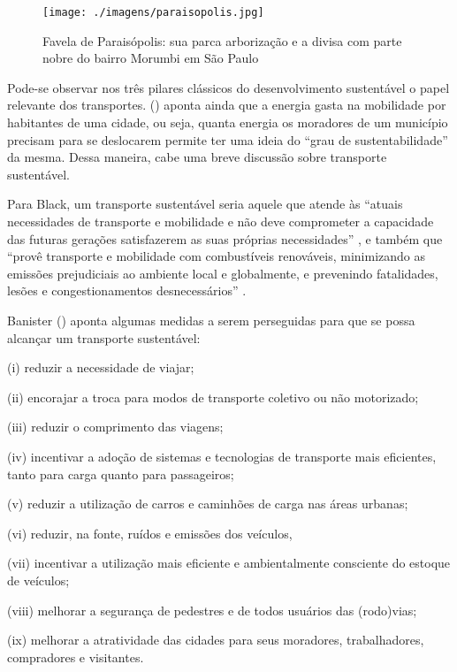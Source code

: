 \begin{figure}[htb]%
    \caption{\label{fig:paraisopolis}Favela de Paraisópolis: sua parca arborização e a divisa com parte nobre do bairro Morumbi em São Paulo}%
    \begin{center}%
        \texttt{[image: ./imagens/paraisopolis.jpg]}%
    \end{center}%
\end{figure}%

Pode-se observar nos três pilares clássicos do desenvolvimento sustentável o papel relevante dos transportes.  (\citeyear{VASCONCELLOS2012}) aponta ainda que a energia gasta na mobilidade por habitantes de uma cidade, ou seja, quanta energia os moradores de um município precisam para se deslocarem permite ter uma ideia do ``grau de sustentabilidade'' da mesma. Dessa maneira, cabe uma breve discussão sobre transporte sustentável.

Para Black, um transporte sustentável seria aquele que atende às ``atuais necessidades de transporte e mobilidade e não deve comprometer a capacidade das futuras gerações satisfazerem as suas próprias necessidades'' \cite[p.151]{BLACK1996}, e também que ``provê transporte e mobilidade com combustíveis renováveis, minimizando as emissões prejudiciais ao ambiente local e globalmente, e prevenindo fatalidades, lesões e congestionamentos desnecessários'' \cite[p.12]{BLACK2010}.

Banister (\citeyear{BANISTER2005,BANISTER2008}) aponta algumas medidas a serem perseguidas para que se possa alcançar um transporte sustentável:
\begin{compactitem}[]
\item (i) reduzir a necessidade de viajar;
\item (ii) encorajar a troca para modos de transporte coletivo ou não motorizado;
\item (iii) reduzir o comprimento das viagens;
\item (iv) incentivar a adoção de sistemas e tecnologias de transporte mais eficientes, tanto para carga quanto para passageiros;
\item (v) reduzir a utilização de carros e caminhões de carga nas áreas urbanas;
\item (vi) reduzir, na fonte, ruídos e emissões dos veículos,
\item (vii) incentivar a utilização mais eficiente e ambientalmente consciente do estoque de veículos;
\item (viii) melhorar a segurança de pedestres e de todos usuários das (rodo)vias;
\item (ix) melhorar a atratividade das cidades para seus moradores, trabalhadores, compradores e visitantes.
\end{compactitem}

